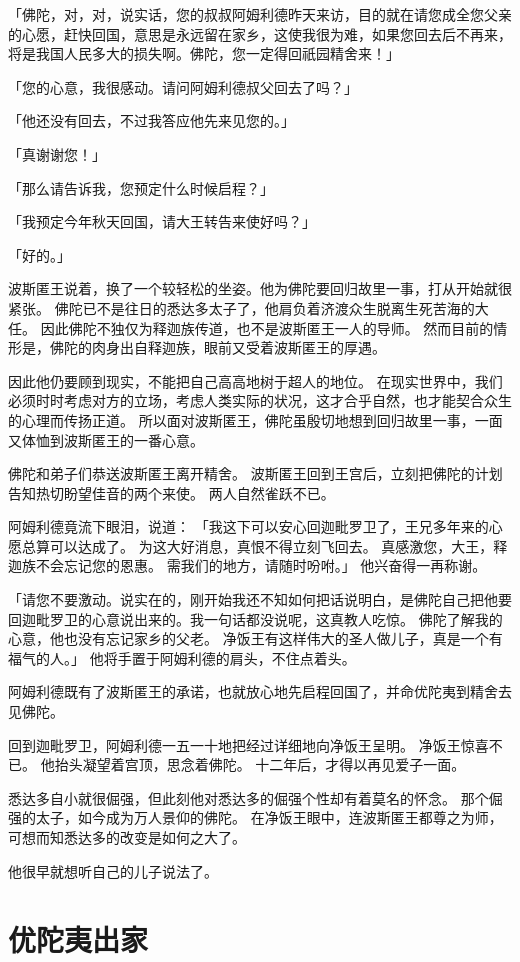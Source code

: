 \documentclass[twoside,openany]{book}
\begin{document}
「佛陀，对，对，说实话，您的叔叔阿姆利德昨天来访，目的就在请您成全您父亲的心愿，赶快回国，意思是永远留在家乡，这使我很为难，如果您回去后不再来，将是我国人民多大的损失啊。佛陀，您一定得回祇园精舍来！」

「您的心意，我很感动。请问阿姆利德叔父回去了吗？」

「他还没有回去，不过我答应他先来见您的。」

「真谢谢您！」

「那么请告诉我，您预定什么时候启程？」

「我预定今年秋天回国，请大王转告来使好吗？」

「好的。」

波斯匿王说着，换了一个较轻松的坐姿。他为佛陀要回归故里一事，打从开始就很紧张。
佛陀已不是往日的悉达多太子了，他肩负着济渡众生脱离生死苦海的大任。
因此佛陀不独仅为释迦族传道，也不是波斯匿王一人的导师。
然而目前的情形是，佛陀的肉身出自释迦族，眼前又受着波斯匿王的厚遇。

因此他仍要顾到现实，不能把自己高高地树于超人的地位。
在现实世界中，我们必须时时考虑对方的立场，考虑人类实际的状况，这才合乎自然，也才能契合众生的心理而传扬正道。
所以面对波斯匿王，佛陀虽殷切地想到回归故里一事，一面又体恤到波斯匿王的一番心意。

佛陀和弟子们恭送波斯匿王离开精舍。
波斯匿王回到王宫后，立刻把佛陀的计划告知热切盼望佳音的两个来使。
两人自然雀跃不已。

阿姆利德竟流下眼泪，说道：
「我这下可以安心回迦毗罗卫了，王兄多年来的心愿总算可以达成了。
为这大好消息，真恨不得立刻飞回去。
真感激您，大王，释迦族不会忘记您的恩惠。
需我们的地方，请随时吩咐。」
他兴奋得一再称谢。

「请您不要激动。说实在的，刚开始我还不知如何把话说明白，是佛陀自己把他要回迦毗罗卫的心意说出来的。我一句话都没说呢，这真教人吃惊。
佛陀了解我的心意，他也没有忘记家乡的父老。
净饭王有这样伟大的圣人做儿子，真是一个有福气的人。」
他将手置于阿姆利德的肩头，不住点着头。

阿姆利德既有了波斯匿王的承诺，也就放心地先启程回国了，并命优陀夷到精舍去见佛陀。

回到迦毗罗卫，阿姆利德一五一十地把经过详细地向净饭王呈明。
净饭王惊喜不已。
他抬头凝望着宫顶，思念着佛陀。
十二年后，才得以再见爱子一面。

悉达多自小就很倔强，但此刻他对悉达多的倔强个性却有着莫名的怀念。
那个倔强的太子，如今成为万人景仰的佛陀。
在净饭王眼中，连波斯匿王都尊之为师，可想而知悉达多的改变是如何之大了。

他很早就想听自己的儿子说法了。

\section{优陀夷出家}\label{sec7.4}
\end{document}
